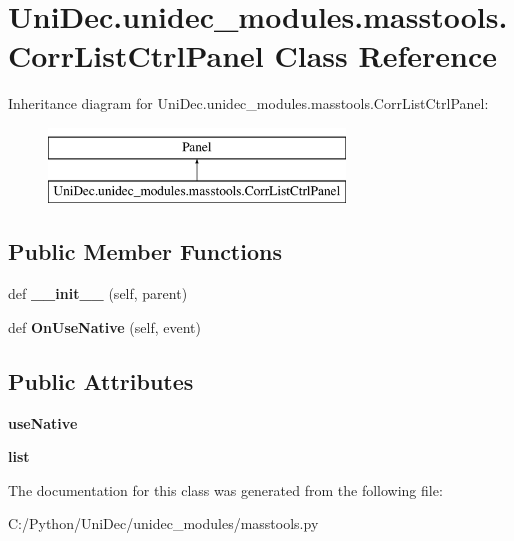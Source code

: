 \hypertarget{class_uni_dec_1_1unidec__modules_1_1masstools_1_1_corr_list_ctrl_panel}{}\section{Uni\+Dec.\+unidec\+\_\+modules.\+masstools.\+Corr\+List\+Ctrl\+Panel Class Reference}
\label{class_uni_dec_1_1unidec__modules_1_1masstools_1_1_corr_list_ctrl_panel}
Inheritance diagram for Uni\+Dec.\+unidec\+\_\+modules.\+masstools.\+Corr\+List\+Ctrl\+Panel\+:\begin{figure}[H]
\begin{center}
\leavevmode
\includegraphics[height=2.000000cm]{class_uni_dec_1_1unidec__modules_1_1masstools_1_1_corr_list_ctrl_panel}
\end{center}
\end{figure}
\subsection*{Public Member Functions}
\begin{DoxyCompactItemize}
\item 
\hypertarget{class_uni_dec_1_1unidec__modules_1_1masstools_1_1_corr_list_ctrl_panel_a1d3e6b439c2a8ccb6f1a9316e205b921}{}def {\bfseries \+\_\+\+\_\+init\+\_\+\+\_\+} (self, parent)\label{class_uni_dec_1_1unidec__modules_1_1masstools_1_1_corr_list_ctrl_panel_a1d3e6b439c2a8ccb6f1a9316e205b921}

\item 
\hypertarget{class_uni_dec_1_1unidec__modules_1_1masstools_1_1_corr_list_ctrl_panel_a1f9528e164cd3098f39786c6017adce2}{}def {\bfseries On\+Use\+Native} (self, event)\label{class_uni_dec_1_1unidec__modules_1_1masstools_1_1_corr_list_ctrl_panel_a1f9528e164cd3098f39786c6017adce2}

\end{DoxyCompactItemize}
\subsection*{Public Attributes}
\begin{DoxyCompactItemize}
\item 
\hypertarget{class_uni_dec_1_1unidec__modules_1_1masstools_1_1_corr_list_ctrl_panel_a7be620ba2dc589ba0c0eb0a19857c8bb}{}{\bfseries use\+Native}\label{class_uni_dec_1_1unidec__modules_1_1masstools_1_1_corr_list_ctrl_panel_a7be620ba2dc589ba0c0eb0a19857c8bb}

\item 
\hypertarget{class_uni_dec_1_1unidec__modules_1_1masstools_1_1_corr_list_ctrl_panel_a4dacc33360fe573cf66347a050ee0c3e}{}{\bfseries list}\label{class_uni_dec_1_1unidec__modules_1_1masstools_1_1_corr_list_ctrl_panel_a4dacc33360fe573cf66347a050ee0c3e}

\end{DoxyCompactItemize}


The documentation for this class was generated from the following file\+:\begin{DoxyCompactItemize}
\item 
C\+:/\+Python/\+Uni\+Dec/unidec\+\_\+modules/masstools.\+py\end{DoxyCompactItemize}
